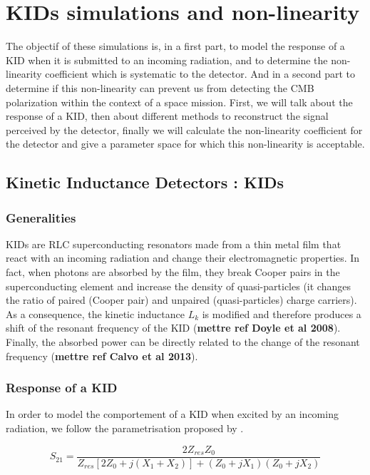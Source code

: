 \documentclass[english,11pt]{report}
\begin{document}
\chapter{KIDs simulations and non-linearity}

The objectif of these simulations is, in a first part, to model the response of a KID when it is submitted to an incoming radiation, and to determine the non-linearity coefficient which is systematic to the detector. And in a second part to determine if this non-linearity can prevent us from detecting the CMB polarization within the context of a space mission. First, we will talk about the response of a KID, then about different methods to reconstruct the signal perceived by the detector, finally we will calculate the non-linearity coefficient for the detector and give a parameter space for which this non-linearity is acceptable.

\section{Kinetic Inductance Detectors : KIDs}
\subsection{Generalities}
KIDs are RLC superconducting resonators made from a thin metal film that react with an incoming radiation and change their electromagnetic properties. In fact, when photons are absorbed by the film, they break Cooper pairs in the superconducting element and increase the density of quasi-particles (it changes the ratio of paired (Cooper pair) and unpaired (quasi-particles) charge carriers). As a consequence, the kinetic inductance $L_{k}$ is modified and therefore produces a shift of the resonant frequency of the KID (\textbf{mettre ref Doyle et al 2008}). Finally, the absorbed power can be directly related to the change of  the resonant frequency (\textbf{mettre ref Calvo et al 2013}).

	\subsection{Response of a KID}
In order to model the comportement of a KID when excited by an incoming radiation, we follow the parametrisation proposed by \cite{2008ApPhL..93m4102G}.

\begin{equation}
S_{21} = \frac{2Z_{res}Z_{0}}{Z_{res}[2Z_{0} + j(X_{1}+X_{2})] + (Z_{0} +jX_{1})(Z_{0} +jX_{2})}
\end{equation}
\end{document}
